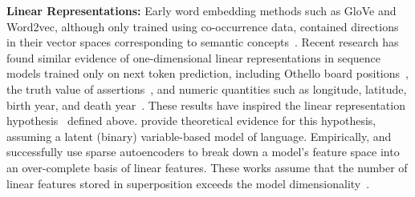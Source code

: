 \documentclass{article} %
\theoremstyle{plain}
\theoremstyle{definition}
\begin{document}
    \textbf{Linear Representations:} Early word embedding methods such as GloVe and Word2vec, although only trained using co-occurrence data, contained directions in their vector spaces corresponding to semantic concepts~\citep{king_and_queen, glove, word2vec}.
    Recent research has found similar evidence of one-dimensional linear representations in sequence models trained only on next token prediction, including Othello board positions~\citep{othello_neel_linear, original_othello_paper}, the truth value of assertions~\citep{linear_truth_sam}, and numeric quantities such as longitude, latitude, birth year, and death year~\citep{space_time, monotonic_numeric_representations}. These results have inspired the linear representation hypothesis~\citep{linear_representation_hypothesis, elhage2022superposition} defined above. \cite{origins_of_linear_representations} provide theoretical evidence for this hypothesis, assuming a latent (binary) variable-based model of language. Empirically, \cite{dictionary_monosemanticity_anthropic} and \cite{other_sae_paper} successfully use sparse autoencoders to break down a model's feature space into an over-complete basis of linear features. These works assume that the number of linear features stored in superposition exceeds the model dimensionality~\citep{elhage2022superposition}.
\end{document}

